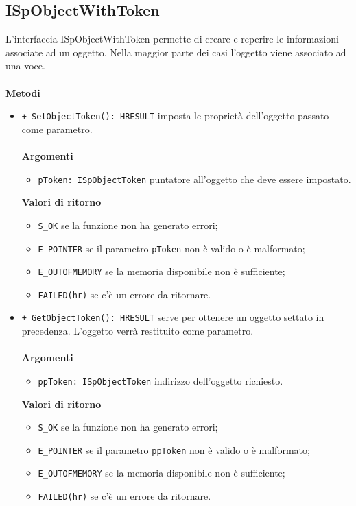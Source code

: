 \subsection{ISpObjectWithToken}
L'interfaccia ISpObjectWithToken permette di creare e reperire le informazioni associate ad un oggetto. Nella maggior parte dei casi l'oggetto viene associato ad una voce.
\\\\
\textbf{Metodi}
\begin{itemize}
	\item \texttt{+ SetObjectToken(): HRESULT} imposta le proprietà dell'oggetto passato come parametro.
	\\\\
	\textbf{Argomenti}
	\begin{itemize}
		\item \texttt{pToken: ISpObjectToken} puntatore all'oggetto che deve essere impostato.
	\end{itemize}
	\textbf{Valori di ritorno}
	\begin{itemize}
		\item \texttt{S\_OK} se la funzione non ha generato errori;
		\item \texttt{E\_POINTER} se il parametro \texttt{pToken} non è valido o è malformato;
		\item \texttt{E\_OUTOFMEMORY} se la memoria disponibile non è sufficiente;
		\item \texttt{FAILED(hr)} se c'è un errore da ritornare. 
	\end{itemize}
	
	\item \texttt{+ GetObjectToken(): HRESULT} serve per ottenere un oggetto settato in precedenza. L'oggetto verrà restituito come parametro.
	\\\\
	\textbf{Argomenti}
	\begin{itemize}
		\item \texttt{ppToken: ISpObjectToken} indirizzo dell'oggetto richiesto.
	\end{itemize}
	\textbf{Valori di ritorno}
	\begin{itemize}
		\item \texttt{S\_OK} se la funzione non ha generato errori;
		\item \texttt{E\_POINTER} se il parametro \texttt{ppToken} non è valido o è malformato;
		\item \texttt{E\_OUTOFMEMORY} se la memoria disponibile non è sufficiente;
		\item \texttt{FAILED(hr)} se c'è un errore da ritornare. 
	\end{itemize}
\end{itemize}

